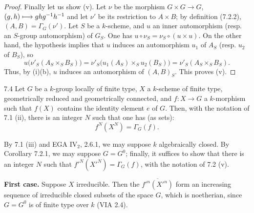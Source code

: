 \begin{proof}
Finally let us show (v). Let $\nu$ be the morphism $G\times G\to G$, $(g,h)\longmapsto ghg^{-1}h^{-1}$ and let $\nu'$ be its restriction to $A\times B$; by definition (7.2.2), $(A,B)=\Gamma_G(\nu')$. Let $S$ be a $k$-scheme, and $u$ an inner automorphism (resp. an $S$-group automorphism) of $G_S$. One has $u\circ\nu_S=\nu_S\circ(u\times u)$. On the other hand, the hypothesis implies that $u$ induces an automorphism $u_1$ of $A_S$ (resp. $u_2$ of $B_S$), so
\[
u\bigl(\nu'_S(A_S\times_SB_S)\bigr)=\nu'_S\bigl(u_1(A_S)\times_Su_2(B_S)\bigr)=\nu'_S(A_S\times_SB_S).
\]
Thus, by (i)(b), $u$ induces an automorphism of $(A,B)_S$. This proves (v).
\end{proof}
\begin{proposition}{7.4}\label{VIB.7.4}
Let $G$ be a $k$-group locally of finite type, $X$ a $k$-scheme of finite type, geometrically reduced and geometrically connected, and $f:X\to G$ a $k$-morphism such that $f(X)$ contains the identity element $e$ of $G$. Then, with the notation of 7.1 (ii), there is an integer $N$ such that one has (as sets):
\[
f^N(X^N)=\Gamma_G(f).
\]
\end{proposition}
By 7.1 (iii) and EGA IV$_2$, 2.6.1, we may suppose $k$ algebraically closed. By Corollary 7.2.1, we may suppose $G=G^0$; finally, it suffices to show that there is an integer $N$ such that $f'^N(X'^N)=\Gamma_G(f)$, with the notation of 7.2 (v).

\textbf{First case.} Suppose $X$ irreducible. Then the $\overline{f'^n(X'^n)}$ form an increasing sequence of irreducible closed subsets of the space $G$, which is noetherian, since $G=G^0$ is of finite type over $k$ (VIA 2.4).
